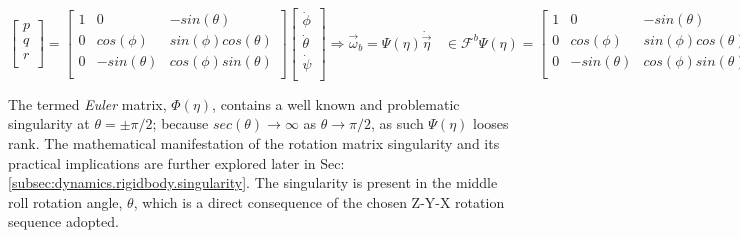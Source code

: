 \begin{subequations}
\begin{equation}\label{eq:angular-rates.b}
\begin{bmatrix}
p\\
q\\
r\\
\end{bmatrix}
=
\begin{bmatrix}
1 & 0 & -sin(\theta)\\
0 & cos(\phi) & sin(\phi)cos(\theta)\\
0 & -sin(\theta) & cos(\phi)sin(\theta)\\
\end{bmatrix}
\begin{bmatrix}
\dot{\phi}\\
\dot{\theta}\\
\dot{\psi}\\
\end{bmatrix}
\end{equation}
\begin{equation}\label{eq:angular-rates.c}
\Rightarrow\vec{\omega}_b=\Psi(\eta)\dot{\vec{\eta}}~~~~\in\mathcal{F}^b
\end{equation}
\begin{equation}\label{eq:angular-rates.d}
\Psi(\eta)=
\begin{bmatrix}
1 & 0 & -sin(\theta)\\
0 & cos(\phi) & sin(\phi)cos(\theta)\\
0 & -sin(\theta) & cos(\phi)sin(\theta)\\
\end{bmatrix}
\end{equation}
\begin{equation}\label{eq:angular-rates.e}
\Rightarrow\dot{\vec{\eta}}=\Psi^{-1}(\eta)\vec{\omega}_b=\Phi(\eta)\vec{\omega}_b~~~~\in\mathcal{F}^{v1,v2,I}
\end{equation}
\begin{equation}\label{eq:angular-rates.f}
\Phi(\eta)=\begin{bmatrix}
1 & sin(\phi)tan(\theta) & cos(\phi)tan(\theta)\\
0 & cos(\phi) & -sin(\phi)\\
0 & sin(\phi)sec(\theta) & cos(\phi)sec(\theta)\\
\end{bmatrix}
\end{equation}
\end{subequations}
\par
The termed \emph{Euler} matrix, $\Phi(\eta)$, contains a well known and problematic singularity at $\theta=\pm\pi/2$; because $sec(\theta)\rightarrow\infty$ as $\theta\rightarrow\pi/2$, as such $\Psi(\eta)$ looses rank. The mathematical manifestation of the rotation matrix singularity and its practical implications are further explored later in Sec:\ref{subsec:dynamics.rigidbody.singularity}. The singularity is present in the middle roll rotation angle, $\theta$, which is a direct consequence of the chosen Z-Y-X rotation sequence adopted. 
